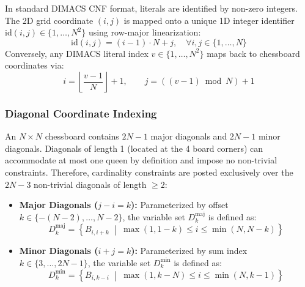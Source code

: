 \documentclass[a4paper,fleqn]{cas-sc}
\begin{document}
In standard DIMACS CNF format, literals are identified by non-zero integers. The 2D grid coordinate $(i, j)$ is mapped onto a unique 1D integer identifier $\text{id}(i, j) \in \{1, \dots, N^2\}$ using row-major linearization:
\begin{equation}
    \text{id}(i, j) = (i - 1) \cdot N + j, \quad \forall i, j \in \{1, \dots, N\} \label{eq:dimacs_mapping}
\end{equation}
Conversely, any DIMACS literal index $v \in \{1, \dots, N^2\}$ maps back to chessboard coordinates via:
\begin{equation}
    i = \left\lfloor \frac{v - 1}{N} \right\rfloor + 1, \qquad j = ((v - 1) \bmod N) + 1 \label{eq:dimacs_inverse}
\end{equation}

\subsubsection{Diagonal Coordinate Indexing}
An $N \times N$ chessboard contains $2N - 1$ major diagonals and $2N - 1$ minor diagonals. Diagonals of length 1 (located at the 4 board corners) can accommodate at most one queen by definition and impose no non-trivial constraints. Therefore, cardinality constraints are posted exclusively over the $2N - 3$ non-trivial diagonals of length $\ge 2$:
\begin{itemize}
    \item \textbf{Major Diagonals ($j - i = k$):} Parameterized by offset $k \in \{-(N-2), \dots, N-2\}$, the variable set $D_k^{\text{maj}}$ is defined as:
    \begin{equation}
        D_k^{\text{maj}} = \left\{ B_{i, i+k} \;\middle|\; \max(1, 1-k) \le i \le \min(N, N-k) \right\} \label{eq:diag_maj_set}
    \end{equation}
    \item \textbf{Minor Diagonals ($i + j = k$):} Parameterized by sum index $k \in \{3, \dots, 2N-1\}$, the variable set $D_k^{\text{min}}$ is defined as:
    \begin{equation}
        D_k^{\text{min}} = \left\{ B_{i, k-i} \;\middle|\; \max(1, k-N) \le i \le \min(N, k-1) \right\} \label{eq:diag_min_set}
    \end{equation}
\end{itemize}
\end{document}
